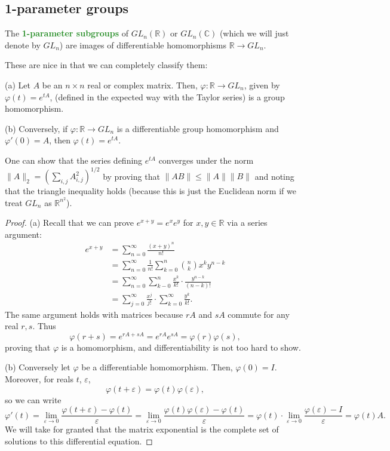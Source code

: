 \documentclass[10pt]{scrartcl}
\providecommand{\eps}{\varepsilon}
\providecommand{\CC}{\mathbb C}
\providecommand{\RR}{\mathbb R}
\providecommand{\vocab}[1]{{\textbf{\textcolor{ForestGreen}{#1}}}}
\begin{document}
\subsection{1-parameter groups}
\begin{definition}
	The \vocab{1-parameter subgroups} of $GL_n(\RR)$ or $GL_n(\CC)$
	(which we will just denote by $GL_n$)
	are images of differentiable homomorphisms $\RR\to GL_n$.
\end{definition}

These are nice in that we can completely classify them:
\begin{theorem}
	(a) Let $A$ be an $n\times n$ real or complex matrix.
	Then, $\varphi\colon\RR\to GL_n$, given by
	$\varphi(t) = e^{tA}$, (defined in the expected way
	with the Taylor series) is a group homomorphism.
	
	(b) Conversely, if $\varphi\colon\RR\to GL_n$ is a differentiable
	group homomorphism and $\varphi'(0) = A$, then $\varphi(t) = e^{tA}$.
\end{theorem}

\begin{remark}[Convergence of $e^{tA}$]
	One can show that the series defining $e^{tA}$ converges
	under the norm $\|A\|_2 = (\sum_{i,j} A_{i,j}^2)^{1/2}$
	by proving that $\|AB\| \le \|A\| \|B\|$ and noting that
	the triangle inequality holds (because this is just the
	Euclidean norm if we treat $GL_n$ as $\RR^{n^2}$).
\end{remark}

\begin{proof}
	(a) Recall that we can prove $e^{x+y} = e^xe^y$ for $x,y\in\RR$ via
	a series argument:
	\begin{align*}
		e^{x+y} &= \sum_{n=0}^\infty \frac{(x+y)^n}{n!}\\
		&= \sum_{n=0}^\infty \frac1{n!}\sum_{k=0}^n \binom nk x^k y^{n-k}\\
		&= \sum_{n=0}^\infty \sum_{k-0}^n
		\frac{x^k}{k!}\cdot\frac{y^{n-k}}{(n-k)!}\\
		&= \sum_{j=0}^\infty \frac{x^j}{j!}\cdot
		\sum_{k=0}^\infty \frac{y^k}{k!}.
	\end{align*}
	The same argument holds with matrices because
	$rA$ and $sA$ commute for any real $r,s$. Thus
	\[\varphi(r+s) = e^{rA+sA} = e^{rA}e^{sA} = \varphi(r)\varphi(s),\]
	proving that $\varphi$ is a homomorphism,
	and differentiability is not too hard to show.
	
	(b) Conversely let $\varphi$ be a differentiable homomorphism.
	Then, $\varphi(0) = I$. Moreover, for reals $t$, $\eps$,
	\[\varphi(t + \eps) = \varphi(t)\varphi(\eps),\]
	so we can write
	\[\varphi'(t) = \lim_{\eps\to0} \frac{\varphi(t+\eps) - \varphi(t)}{\eps}
	= \lim_{\eps\to 0} \frac{\varphi(t)\varphi(\eps) - \varphi(t)}{\eps}
	= \varphi(t)\cdot\lim_{\eps\to0} \frac{\varphi(\eps) - I}{\eps}
	= \varphi(t)A.\]
	We will take for granted that the matrix exponential
	is the complete set of solutions to this differential equation.
\end{proof}
\end{document}

